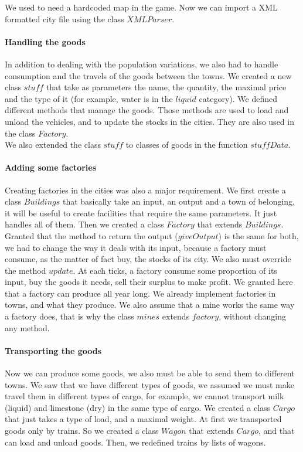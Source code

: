 \documentclass[a4paper]{article}
\begin{document}
	We used to need a hardcoded map in the game. Now we can import a XML formatted city file using the class $XMLParser$.

	\paragraph{Handling the goods}

	In addition to dealing with the population variations, we also had to handle consumption and the travels of the goods between the towns. We created a new class $stuff$ that take as parameters the name, the quantity, the maximal price and the type of it (for example, water is in the $liquid$ category). We defined different methods that manage the goods. Those methods are used to load and unload the vehicles, and to update the stocks in the cities. They are also used in the class $Factory$.\\

	We also extended the class $stuff$ to classes of goods in the function $ stuffData$.

	\paragraph{Adding some factories}
	Creating factories in the cities was also a major requirement. We first create a class $Buildings$ that basically take an input, an output and a town of belonging, it will be useful to create facilities that require the same parameters. It just handles all of them. Then we created a class $Factory$ that extends $Buildings$. Granted that the method to return the output ($giveOutput$) is the same for both, we had to change the way it deals with its input, because a factory must consume, as the matter of fact buy, the stocks of its city. We also must override the method $update$. At each ticks, a factory consume some proportion of its input, buy the goods it needs, sell their surplus to make profit. We granted here that a factory can produce all year long. We already implement factories in towns, and what they produce.
	 We also assume that a mine works the same way a factory does, that is why the class $mines$ extends $factory$, without changing any method.

	\paragraph{Transporting the goods}
	Now we can produce some goods, we also must be able to send them to different towns. We saw that we have different types of goods, we assumed we must make travel them in different types of cargo, for example, we cannot transport milk (liquid) and limestone (dry) in the same type of cargo. We created a class $Cargo$ that just takes a type of load, and a maximal weight. At first we transported goods only by trains. So we created a class $Wagon$ that extends $Cargo$, and that can load and unload goods. Then, we redefined trains by lists of wagons.
\end{document}

